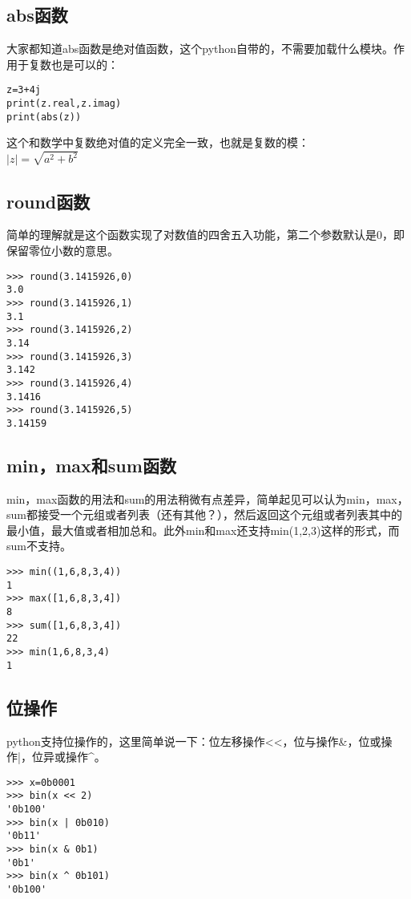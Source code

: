 \documentclass[12pt,oneside]{book}
\begin{document}
\begin{common-format}
\subsection{abs函数}
大家都知道abs函数是绝对值函数，这个python自带的，不需要加载什么模块。作用于复数也是可以的：
\begin{Verbatim}
z=3+4j
print(z.real,z.imag)
print(abs(z))
\end{Verbatim}

这个和数学中复数绝对值的定义完全一致，也就是复数的模：\\
$ \left| z \right| =\sqrt { a^{ 2 }+b^{ 2 } }  $

\subsection{round函数}
简单的理解就是这个函数实现了对数值的四舍五入功能，第二个参数默认是0，即保留零位小数的意思。
\begin{Verbatim}
>>> round(3.1415926,0)
3.0
>>> round(3.1415926,1)
3.1
>>> round(3.1415926,2)
3.14
>>> round(3.1415926,3)
3.142
>>> round(3.1415926,4)
3.1416
>>> round(3.1415926,5)
3.14159
\end{Verbatim}



\subsection{min，max和sum函数}
\label{sec:sum函数}
min，max函数的用法和sum的用法稍微有点差异，简单起见可以认为min，max，sum都接受一个元组或者列表（还有其他？），然后返回这个元组或者列表其中的最小值，最大值或者相加总和。此外min和max还支持min(1,2,3)这样的形式，而sum不支持。
\begin{Verbatim}
>>> min((1,6,8,3,4))
1
>>> max([1,6,8,3,4])
8
>>> sum([1,6,8,3,4])
22
>>> min(1,6,8,3,4)
1
\end{Verbatim}



\subsection{位操作}
python支持位操作的，这里简单说一下：位左移操作<<，位与操作\&{}，位或操作|，位异或操作\^{}。
\begin{Verbatim}
>>> x=0b0001
>>> bin(x << 2)
'0b100'
>>> bin(x | 0b010)
'0b11'
>>> bin(x & 0b1)
'0b1'
>>> bin(x ^ 0b101)
'0b100'
\end{Verbatim}





\end{common-format}
\end{document}
